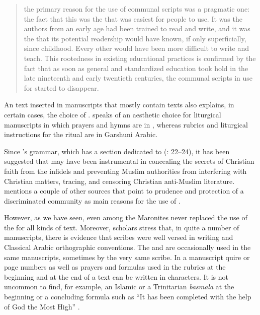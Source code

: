 \documentclass[output=paper,colorlinks,citecolor=brown,arabfont,syriacfont]{langscibook}
\begin{document}
\begin{quote}
the primary reason for the use of communal scripts was a pragmatic one: the fact that this was the  that was easiest for people to use. It was the  authors from an early age had been trained to read and write, and it was the  that its potential readership would have known, if only superficially, since childhood. Every other  would have been more difficult to write and teach. This rootedness in existing educational practices is confirmed by the fact that as soon as general and standardized education took hold in the late nineteenth and early twentieth centuries, the communal scripts in use for  started to disappear. \citep[26]{murre-van_den_berg2020}
\end{quote}

An  text inserted in manuscripts that mostly contain  texts also explains, in certain cases, the choice of . \citet[71]{briquel_chatonnet2015} speaks of an aesthetic choice for liturgical manuscripts in which prayers and hymns are in , whereas rubrics and liturgical instructions for the ritual are in Garshuni Arabic.

Since \citeauthor{amira1596}'s  grammar, which has a section dedicated to  (\citeyear{amira1596}: 22--24), it has been suggested that  may have been instrumental in concealing the secrets of Christian faith from the infidels and preventing Muslim authorities from interfering with Christian matters, tracing, and censoring Christian anti-Muslim literature. \citet[119--121]{moukarzel2014a} mentions a couple of other sources that point to prudence and protection of a discriminated community as main reasons for the use of .

However, as we have seen, even among the Maronites  never replaced the use of the   for all kinds of text. Moreover, scholars stress that, in quite a number of  manuscripts, there is evidence that scribes were well versed in  writing and Classical Arabic orthographic conventions. The   and  are occasionally used in the same manuscripts, sometimes by the very same scribe. In a  manuscript quire or page numbers as well as prayers and formulas used in the rubrics at the beginning and at the end of a text can be written in  characters. It is not uncommon to find, for example, an  Islamic or a Trinitarian \textit{basmala} at the beginning or a concluding formula such as ``It has been completed with the help of God the Most High'' \citep[221]{mccollum2014}. 
\end{document}
